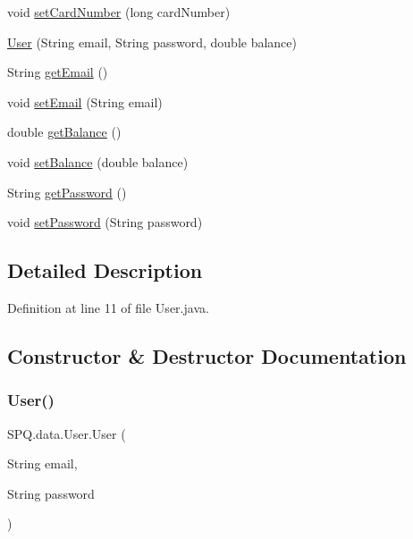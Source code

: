 \begin{DoxyCompactItemize}
\item 
void \mbox{\hyperlink{class_s_p_q_1_1data_1_1_user_a6d98a72cb61e95f5417e10e0ba80afab}{set\+Card\+Number}} (long card\+Number)
\item 
\mbox{\hyperlink{class_s_p_q_1_1data_1_1_user_aa21a25c33b963c3af6fb07331f4cd400}{User}} (String email, String password, double balance)
\item 
String \mbox{\hyperlink{class_s_p_q_1_1data_1_1_user_a4f3ae0062ee7529314a5b791707ff4b4}{get\+Email}} ()
\item 
void \mbox{\hyperlink{class_s_p_q_1_1data_1_1_user_ab7132f971882fb88afc6999cf5473ef4}{set\+Email}} (String email)
\item 
double \mbox{\hyperlink{class_s_p_q_1_1data_1_1_user_a03cc880edbf4758b44318af1587824e5}{get\+Balance}} ()
\item 
void \mbox{\hyperlink{class_s_p_q_1_1data_1_1_user_ab9b205d96fa6c53cc3956c2ddcc9c4a7}{set\+Balance}} (double balance)
\item 
String \mbox{\hyperlink{class_s_p_q_1_1data_1_1_user_a688c1eadd21594d52967d87289e23ce2}{get\+Password}} ()
\item 
void \mbox{\hyperlink{class_s_p_q_1_1data_1_1_user_aa5bcf362d3c9c4746f406239bcb041f5}{set\+Password}} (String password)
\end{DoxyCompactItemize}


\subsection{Detailed Description}


Definition at line 11 of file User.\+java.



\subsection{Constructor \& Destructor Documentation}
\mbox{\label{class_s_p_q_1_1data_1_1_user_acc8d4cd3f95c3da8a14117c6057a3e8b}} 
\subsubsection{\texorpdfstring{User()}{User()}\hspace{0.1cm}{\footnotesize\ttfamily [1/5]}}
{\footnotesize\ttfamily S\+P\+Q.\+data.\+User.\+User (\begin{DoxyParamCaption}\item[{String}]{email,  }\item[{String}]{password }\end{DoxyParamCaption})}



